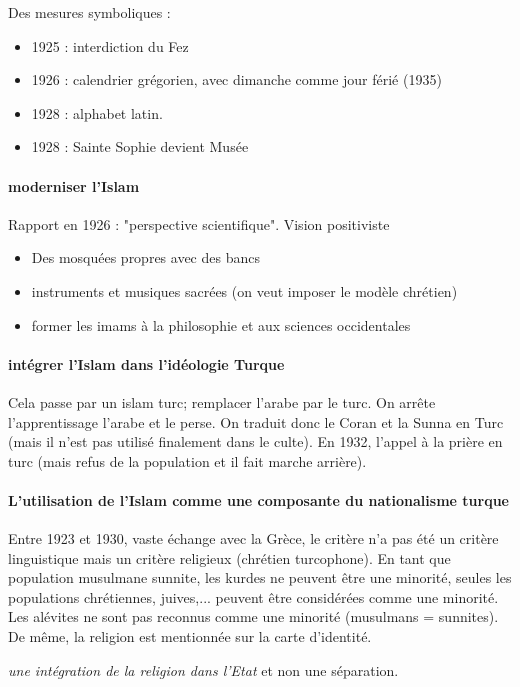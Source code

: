Des mesures symboliques : 
\begin{itemize}
    \item 1925 : interdiction du Fez
    \item 1926 : calendrier grégorien, avec dimanche comme jour férié (1935)
    \item 1928 : alphabet latin. 
    \item 1928 : Sainte Sophie devient Musée
\end{itemize}


\paragraph{moderniser l'Islam}

Rapport en 1926 : "perspective scientifique". Vision positiviste
\begin{itemize}
    \item Des mosquées propres avec des bancs
    \item instruments et musiques sacrées (on veut imposer le modèle chrétien)
    \item former les imams à la philosophie et aux sciences occidentales
\end{itemize}

\paragraph{intégrer l'Islam dans l'idéologie Turque}
Cela passe par un islam turc; remplacer l'arabe par le turc. On arrête l'apprentissage l'arabe et le perse. On traduit donc le Coran et la Sunna en Turc (mais il n'est pas utilisé finalement dans le culte). 
En 1932, l'appel à la prière en turc (mais refus de la population et il fait marche arrière).

\paragraph{L'utilisation de l'Islam comme une composante du nationalisme turque} Entre 1923 et 1930, vaste échange avec la Grèce, le critère n'a pas été un critère linguistique mais un critère religieux (chrétien turcophone). 
En tant que population musulmane sunnite, les kurdes ne peuvent être une minorité, seules les populations chrétiennes, juives,... peuvent être considérées comme une minorité. Les alévites ne sont pas reconnus comme une minorité (musulmans = sunnites). De même, la religion est mentionnée sur la carte d'identité. 
\begin{Synthesis}
\textit{une intégration de la religion dans l'Etat} et non une séparation. 
  
\end{Synthesis}


